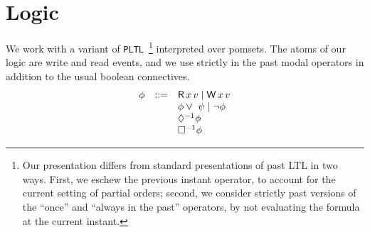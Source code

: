 \section{Logic}
\label{sec:logic}

\newcommand{\since}[2]{{#1} \  {\tt  S } \  {#2}}
\newcommand{\pLTL}{{\tt PLTL}}
\newcommand{\once}{\Diamond^{-1}}
\newcommand{\pastalways}{\Box^{-1}}
\newcommand{\afo}{\phi}
\newcommand{\bfo}{\psi}
\newcommand{\mods}{\tt Models}



We work with a variant of \pLTL\ \footnote{ Our presentation differs from standard presentations of past LTL\citet{Lichtenstein:1985:GP:648065.747612} in two ways.  First, we eschew the previous instant operator, to account for the current setting of partial orders; second, we consider strictly past  versions of the ``once'' and ``always in the past'' operators, by not evaluating the formula at the current instant.}   interpreted over pomsets.  The atoms of our logic are write and read events, and we use strictly in the past modal operators in addition to the usual boolean connectives.
\[
\begin{array}{lrl}
 \afo &::=&\DR{\aLoc}{\aVal}  \mid \DW\aLoc\aVal \\
      &&  \afo \vee\ \bfo \mid \neg \afo  \\
      && \once\afo \\
      && \pastalways\afo
\end{array} 
\]

